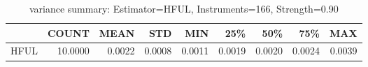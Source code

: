 \begin{table}[ht]
\centering
\caption{variance summary: Estimator=HFUL, Instruments=166, Strength=0.90}
\begin{tabular}{lrrrrrrrr}
\toprule
 & COUNT & MEAN & STD & MIN & 25\% & 50\% & 75\% & MAX \\
\midrule
HFUL & 10.0000 & 0.0022 & 0.0008 & 0.0011 & 0.0019 & 0.0020 & 0.0024 & 0.0039 \\
\bottomrule
\end{tabular}
\end{table}

